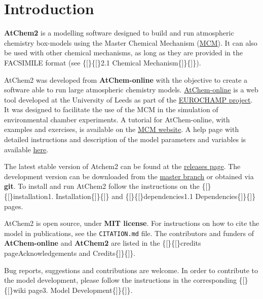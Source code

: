 \chapter{Introduction} \label{ch:introduction}

\textbf{AtChem2} is a modelling software designed to build and run
atmospheric chemistry box-models using the Master Chemical Mechanism
(\href{http://mcm.leeds.ac.uk/MCM/}{MCM}). It can also be used with
other chemical mechanisms, as long as they are provided in the
FACSIMILE format (see \{{[}\}\{{[}\}2.1 Chemical
Mechanism\{{]}\}\{{]}\}).

AtChem2 was developed from \textbf{AtChem-online} with the objective
to create a software able to run large atmospheric chemistry
models. \href{https://atchem.leeds.ac.uk/webapp/}{AtChem-online} is a
web tool developed at the University of Leeds as part of the
\href{https://www.eurochamp.org/}{EUROCHAMP project}. It was designed
to facilitate the use of the MCM in the simulation of environmental
chamber experiments. A tutorial for AtChem-online, with examples and
exercises, is available on the
\href{http://mcm.leeds.ac.uk/MCMv3.3.1/atchem/tutorial_intro.htt}{MCM
  website}. A help page with detailed instructions and description of
the model parameters and variables is available
\href{https://atchem.leeds.ac.uk/webapp/run/help.html}{here}.

The latest stable version of Atchem2 can be found at the
\href{https://github.com/AtChem/AtChem2/releases}{releases page}. The
development version can be downloaded from the
\href{https://github.com/AtChem/AtChem2/archive/master.zip}{master
  branch} or obtained via \textbf{git}. To install and run AtChem2
follow the instructions on the \{{[}\}\{{[}\}installation\textbar{}1.
Installation\{{]}\}\{{]}\} and \{{[}\}\{{[}\}dependencies\textbar{}1.1
Dependencies\{{]}\}\{{]}\} pages.

AtChem2 is open source, under \textbf{MIT license}. For instructions
on how to cite the model in publications, see the \texttt{CITATION.md}
file. The contributors and funders of \textbf{AtChem-online} and
\textbf{AtChem2} are listed in the \{{[}\}\{{[}\}credits
page\textbar{}Acknowledgements and Credits\{{]}\}\{{]}\}.

Bug reports, suggestions and contributions are welcome. In order to
contribute to the model development, please follow the instructions in
the corresponding \{{[}\}\{{[}\}wiki page\textbar{}3. Model
Development\{{]}\}\{{]}\}.
